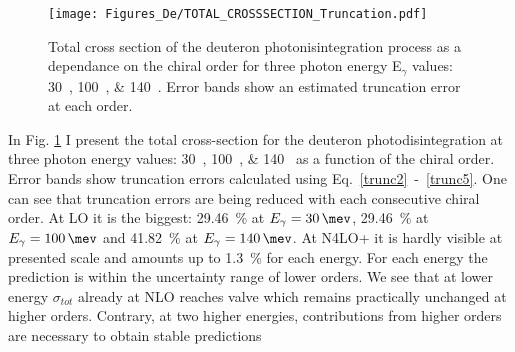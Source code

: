     \begin{figure}[htb!]
        \begin{center}
            \texttt{[image: Figures\_De/TOTAL\_CROSSSECTION\_Truncation.pdf]}
        \end{center}
        \caption{Total cross section of the deuteron photonisintegration
        process as a dependance on the chiral order for three photon energy E$_\gamma$ values: \SIlist[list-units = single]{30;100;140}{\mev}.
        Error bands show an estimated truncation error at each order.}
        \label{Trunc_100}
    \end{figure}
    
    In Fig. \ref{Trunc_100} I present the
    total cross-section for the deuteron photodisintegration 
    at three photon energy values: \SIlist[list-units = single]{30;100;140}{\mev} as a function of the chiral order.
    Error bands show truncation errors calculated using Eq.~\ref{trunc2}~-~\ref{trunc5}.
    One can see that truncation errors are being reduced with each consecutive chiral order. 
    At LO it is the biggest: \SI{29.46}{\percent} at $E_\gamma = \SI{30}{\mev}$,
    \SI{29.46}{\percent} at $E_\gamma = \SI{100}{\mev}$ and
    \SI{41.82}{\percent} at $E_\gamma = \SI{140}{\mev}$.
    At N4LO+ it is hardly visible at presented scale and amounts up to 
    \SI{1.3}{\percent} for each energy.
    For each energy the prediction is within the uncertainty range of lower orders.
    We see that at lower energy $\sigma_{tot}$ already at NLO reaches valve which remains
    practically unchanged at higher orders.
    Contrary, at two higher energies, contributions from higher orders are necessary to obtain 
    stable predictions 

